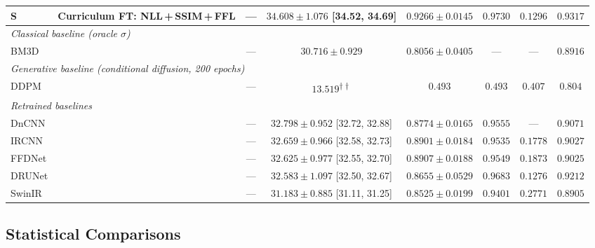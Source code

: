 \documentclass[12pt, a4paper, twoside, openright]{book}
\begin{document}
\begin{landscape}
\begin{longtable}{llcccccc}
S & Curriculum FT: NLL\,+\,SSIM\,+\,FFL          & --- & $34.608 \pm 1.076$ {[34.52, 34.69]} & $0.9266 \pm 0.0145$ & $0.9730$ & $0.1296$ & $0.9317$ \\
\midrule
\multicolumn{8}{l}{\textit{Classical baseline (oracle $\sigma$)}} \\
BM3D & \cite{dabov_image_2007} & --- & $30.716 \pm 0.929$ & $0.8056 \pm 0.0405$ & --- & --- & $0.8916$ \\
\midrule
\multicolumn{8}{l}{\textit{Generative baseline (conditional diffusion, 200 epochs)}} \\
DDPM & \cite{saharia_palette_2022} & --- & $13.519$\textsuperscript{$\dagger\dagger$} & $0.493$ & $0.493$ & $0.407$ & $0.804$ \\
\midrule
\multicolumn{8}{l}{\textit{Retrained baselines}} \\
DnCNN  & \cite{zhang_beyond_2017}  & --- & $32.798 \pm 0.952$ {[32.72, 32.88]} & $0.8774 \pm 0.0165$ & $0.9555$ & ---      & $0.9071$ \\
IRCNN  & \cite{zhang_learning_2017}& --- & $32.659 \pm 0.966$ {[32.58, 32.73]} & $0.8901 \pm 0.0184$ & $0.9535$ & $0.1778$ & $0.9027$ \\
FFDNet & \cite{zhang_ffdnet_2018}  & --- & $32.625 \pm 0.977$ {[32.55, 32.70]} & $0.8907 \pm 0.0188$ & $0.9549$ & $0.1873$ & $0.9025$ \\
DRUNet & \cite{zhang_drunet_2021}  & --- & $32.583 \pm 1.097$ {[32.50, 32.67]} & $0.8655 \pm 0.0529$ & $0.9683$ & $0.1276$ & $0.9212$ \\
SwinIR & \cite{liang_swinir_2021}  & --- & $31.183 \pm 0.885$ {[31.11, 31.25]} & $0.8525 \pm 0.0199$ & $0.9401$ & $0.2771$ & $0.8905$ \\
%
\end{longtable}
\end{landscape}

\subsection{Statistical Comparisons}
\label{sec:results:recon:stats}
\end{document}

